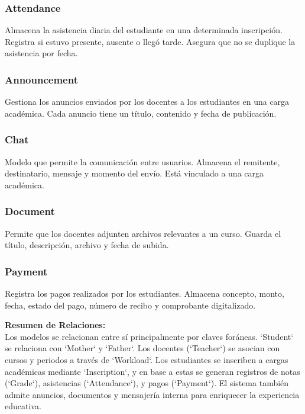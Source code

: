 \documentclass{article}
\begin{document}
        \subsubsection{Attendance}
        Almacena la asistencia diaria del estudiante en una determinada inscripción. Registra si estuvo presente, ausente o llegó tarde. Asegura que no se duplique la asistencia por fecha.

        \subsubsection{Announcement}
        Gestiona los anuncios enviados por los docentes a los estudiantes en una carga académica. Cada anuncio tiene un título, contenido y fecha de publicación.

        \subsubsection{Chat}
        Modelo que permite la comunicación entre usuarios. Almacena el remitente, destinatario, mensaje y momento del envío. Está vinculado a una carga académica.

        \subsubsection{Document}
        Permite que los docentes adjunten archivos relevantes a un curso. Guarda el título, descripción, archivo y fecha de subida.

        \subsubsection{Payment}
        Registra los pagos realizados por los estudiantes. Almacena concepto, monto, fecha, estado del pago, número de recibo y comprobante digitalizado.

        \vspace{0.5cm}
        \textbf{Resumen de Relaciones:}\\
        Los modelos se relacionan entre sí principalmente por claves foráneas. `Student` se relaciona con `Mother` y `Father`. Los docentes (`Teacher`) se asocian con cursos y periodos a través de `Workload`. Los estudiantes se inscriben a cargas académicas mediante `Inscription`, y en base a estas se generan registros de notas (`Grade`), asistencias (`Attendance`), y pagos (`Payment`). El sistema también admite anuncios, documentos y mensajería interna para enriquecer la experiencia educativa.
\end{document}
